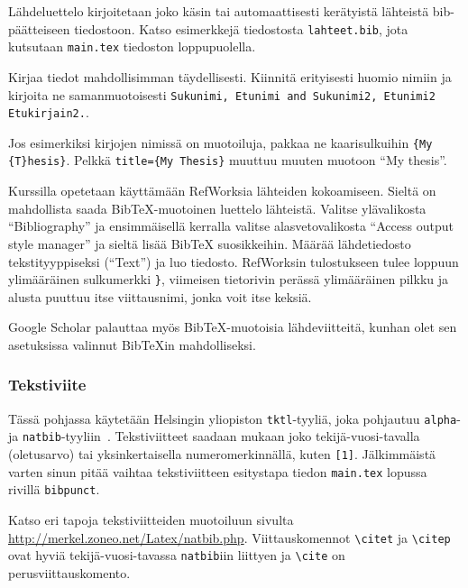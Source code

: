 Lähdeluettelo kirjoitetaan joko käsin tai automaattisesti
kerätyistä lähteistä bib-päät\-tei\-seen tiedostoon. Katso 
esimerkkejä tiedostosta \verb!lahteet.bib!, jota kutsutaan
\verb!main.tex! tiedoston loppupuolella. 

Kirjaa tiedot mahdollisimman täydellisesti. Kiinnitä erityisesti
huomio nimiin ja kirjoita ne samanmuotoisesti
\verb!Sukunimi, Etunimi and Sukunimi2, Etunimi2 Etukirjain2.!.

Jos esimerkiksi kirjojen nimissä on muotoiluja, pakkaa ne
kaarisulkuihin \verb!{My {T}hesis}!. 
Pelkkä \verb!title={My Thesis}! muuttuu muuten
muotoon ``My thesis''.

Kurssilla opetetaan käyttämään RefWorksia lähteiden kokoamiseen.
Sieltä on mahdollista saada BibTeX-muotoinen luettelo lähteistä.
Valitse ylävalikosta ``Bibliography'' ja ensimmäisellä kerralla
valitse alasvetovalikosta ``Access output style manager'' ja
sieltä lisää BibTeX suosikkeihin. Määrää lähdetiedosto tekstityyppiseksi
(``Text'') ja luo tiedosto. RefWorksin tulostukseen tulee loppuun
ylimääräinen sulkumerkki \verb!}!, viimeisen tietorivin perässä
ylimääräinen pilkku ja alusta puuttuu itse viittausnimi, jonka
voit itse keksiä.

Google Scholar palauttaa myös BibTeX-muotoisia lähdeviitteitä,
kunhan olet sen asetuksissa valinnut BibTeXin mahdolliseksi.

\subsubsection{Tekstiviite}
\label{sec:esimtekstiviite}

Tässä pohjassa käytetään Helsingin yliopiston 
\verb!tktl!-tyyliä, joka pohjautuu \verb!alpha!-
ja \verb!natbib!-tyyliin~\cite{RefWorks:doc:601937178f0884cb02a8458c}.
Tekstiviitteet saadaan mukaan joko tekijä-vuosi-tavalla (oletusarvo)
tai yksinkertaisella numeromerkinnällä, kuten \verb![1]!. 
Jälkimmäistä varten sinun pitää vaihtaa tekstiviitteen esitystapa
tiedon \verb!main.tex! lopussa rivillä \verb!bibpunct!. 

\begin{sloppypar}
Katso eri tapoja tekstiviitteiden muotoiluun sivulta
\url{http://merkel.zoneo.net/Latex/natbib.php}.
Viittauskomennot  \verb!\citet! ja \verb!\citep! ovat
hyviä tekijä-vuosi-tavassa \verb!natbib!iin liittyen
ja \verb!\cite! on perusviittauskomento.
\end{sloppypar}

